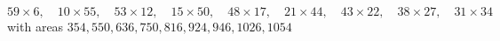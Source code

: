 \[
59\times6,\quad 10\times55,\quad 53\times12,\quad 15\times50,\quad 48\times17,\quad 21\times44,\quad 43\times22,\quad 38\times27,\quad 31\times34
\]
with areas $354, 550, 636, 750, 816, 924, 946, 1026, 1054$%